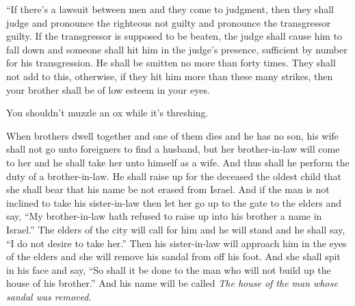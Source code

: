 
\begin{inparaenum}
   ``If there's a lawsuit between men and they come to judgment, then they shall judge and pronounce the righteous not guilty and pronounce the transgressor guilty.%
   If the transgressor is supposed to be beaten, the judge shall cause him to fall down and someone shall hit him in the judge's presence, sufficient by number for his transgression.%
   He shall be smitten no more than forty times. They shall not add to this, otherwise, if they hit him more than these many strikes, then your brother shall be of low esteem in your eyes.%
  
   You shouldn't muzzle an ox while it's threshing.%
  
   When brothers dwell together and one of them dies and he has no son, his wife shall not go unto foreigners to find a husband, but her brother-in-law will come to her and he shall take her unto himself as a wife. And thus shall he perform the duty of a brother-in-law.%
   He shall raise up for the deceased the oldest child that she shall bear that his name be not erased from Israel.%
   And if the man is not inclined to take his sister-in-law then let her go up to the gate to the elders and say, ``My brother-in-law hath refused to raise up into his brother a name in Israel.''%
   The elders of the city will call for him and he will stand and he shall say, ``I do not desire to take her.''%
   Then his sister-in-law will approach him in the eyes of the elders and she will remove his sandal from off his foot. And she shall spit in his face and say, ``So shall it be done to the man who will not build up the house of his brother.''%
   And his name will be called \textit{The house of the man whose sandal was removed}.%
  

\end{inparaenum}
